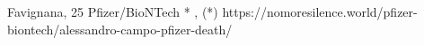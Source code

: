           {
            Favignana, 
          }
          {
            25
          }
          {
            Pfizer/BioNTech
          }
          {
            *
          }
          {
            ,
             (*)
          }
          {
            https://nomoresilence.world/pfizer-biontech/alessandro-campo-pfizer-death/
          }

